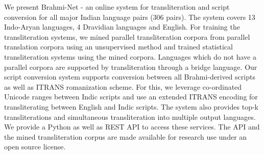 We present Brahmi-Net - an online system for transliteration and script conversion for all major Indian language pairs (306 pairs). The system covers 13 Indo-Aryan languages, 4 Dravidian languages and English. For training the transliteration systems, we mined parallel transliteration corpora from parallel translation corpora using an unsupervised method and trained statistical transliteration systems using the mined corpora. Languages which do not have a parallel corpora are supported by transliteration through a bridge language. Our script conversion system supports conversion between all Brahmi-derived scripts as well as ITRANS romanization scheme. For this, we leverage co-ordinated Unicode ranges between Indic scripts and use an extended ITRANS encoding for transliterating between English and Indic scripts. The system also provides top-k transliterations and simultaneous transliteration into multiple output languages. We provide a Python as well as REST API to access these services. The API and the mined transliteration corpus are made available for research use under an open source license.
